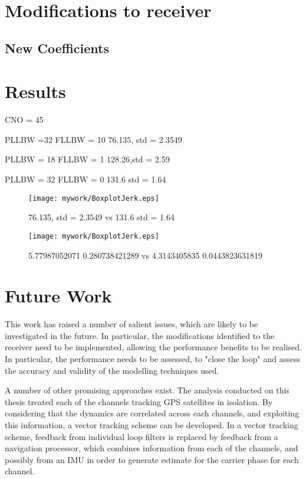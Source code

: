 \section{Modifications to receiver}

\subsection{New Coefficients}

\section{Results}

CNO = 45

PLLBW =32
FLLBW = 10
76.135, std = 2.3549

PLLBW = 18
FLLBW = 1
128.26,std =  2.59 

PLLBW = 32
FLLBW = 0
131.6 std = 1.64

\begin{figure}[!htb] 
    \centering
    \texttt{[image: mywork/BoxplotJerk.eps]} 
    \caption{ 76.135, std = 2.3549 vs 131.6 std = 1.64}
    \label{fig:BoxplotJerk}
\end{figure}


\begin{figure}[!htb] 
    \centering
    \texttt{[image: mywork/BoxplotJerk.eps]} 
    \caption{5.77987052071 0.280738421289 vs 4.3143405835 0.0443823631819}
    \label{fig:BoxplotPhaseJitter}
\end{figure}



\section{Future Work}
This work has raised a number of salient issues, which are likely to be investigated in the future.
In particular, the modifications identified to the receiver need to be implemented, allowing the performance benefits to be realised. In particular, the performance needs to be assessed, to "close the loop" and assess the accuracy and validity of the modelling techniques used.

A number of other promising approaches exist. The analysis conducted on this thesis treated each of the channels tracking GPS satellites in isolation. By considering that the dynamics are correlated across each channels, and exploiting this information, a vector tracking scheme can be developed. In a vector tracking scheme, feedback from individual loop filters is replaced by feedback from a navigation processor, which combines information from each of the channels, and possibly from an IMU in order to generate estimate for the carrier phase for each channel. 













